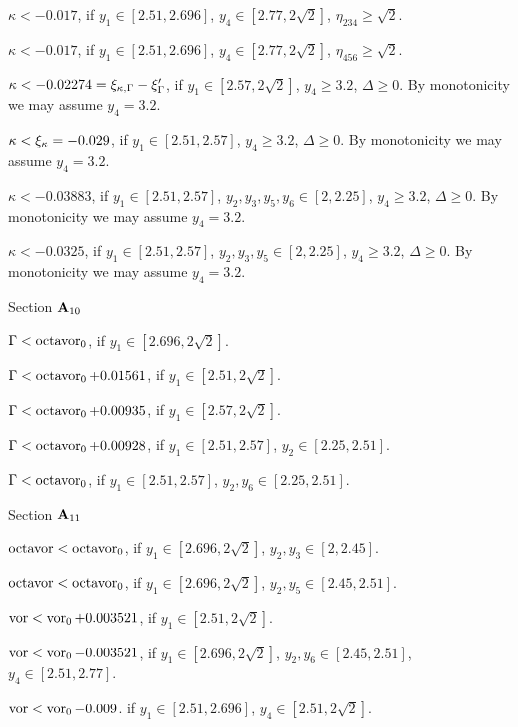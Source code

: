  $\kappa < -0.017$,
	if $y_1\in[2.51,2.696]$, $y_4\in[2.77,2\sqrt{2}]$, $\eta_{234}\ge \sqrt{2}$.

 $\kappa < -0.017$,
	if $y_1\in[2.51,2.696]$, $y_4\in[2.77,2\sqrt{2}]$, 
		$\eta_{456}\ge \sqrt{2}$.

 $\kappa< -0.02274 = \xi_{\kappa,\Gamma}-\xi_\Gamma'$, if
	$y_1\in[2.57,2\sqrt{2}]$, $y_4\ge 3.2$, 
	$\Delta\ge0$.
By monotonicity we may assume $y_4=3.2$. 

 $\kappa< \xi_\kappa = -0.029$, if
	$y_1\in[2.51,2.57]$, $y_4\ge 3.2$, 
	$\Delta\ge0$.
By monotonicity we may assume $y_4=3.2$. 

  $\kappa< -0.03883$,
	if $y_1\in[2.51,2.57]$,
	$y_2,y_3,y_5,y_6\in[2,2.25]$,
	$y_4\ge3.2$, $\Delta\ge0$.
By monotonicity we may assume $y_4=3.2$. 
	
  $\kappa< -0.0325$,
	if $y_1\in[2.51,2.57]$,
	$y_2,y_3,y_5\in[2,2.25]$,
	$y_4\ge3.2$,
	$\Delta\ge0$.   
By monotonicity we may assume $y_4=3.2$. 

\subhead Section ${\bold A}_{10}$\endsubhead


  $\Gamma< \operatorname{octavor}_0$, if
	$y_1\in[2.696,2\sqrt{2}]$.


 $\Gamma < \operatorname{octavor}_0 + 0.01561$, 
	if $y_1\in[2.51,2\sqrt{2}]$.

 $\Gamma < \operatorname{octavor}_0 + 0.00935$, if
	$y_1\in[2.57,2\sqrt{2}]$.

 $\Gamma<\operatorname{octavor}_0+0.00928$,
	if $y_1\in[2.51,2.57]$,
	$y_2\in [2.25,2.51]$.

 $\Gamma<\operatorname{octavor}_0$,
	if $y_1\in[2.51,2.57]$,
	$y_2,y_6\in [2.25,2.51]$.

\subhead Section ${\bold A}_{11}$\endsubhead


 $\operatorname{octavor}<\operatorname{octavor}_0$, if $y_1\in[2.696,2\sqrt{2}]$,
$y_2,y_3\in[2,2.45]$.

 $\operatorname{octavor}< \operatorname{octavor}_0$, if $y_1\in[2.696,2\sqrt{2}]$,
	$y_2,y_5\in[2.45,2.51]$.

  $\operatorname{vor}<\operatorname{vor}_0 + 0.003521$, if $y_1\in[2.51,2\sqrt{2}]$.

 $\operatorname{vor} <\operatorname{vor}_0 - 0.003521$, if
	$y_1\in[2.696,2\sqrt{2}]$, $y_2,y_6\in[2.45,2.51]$,
	$y_4\in[2.51,2.77]$. 

 $\operatorname{vor} < \operatorname{vor}_0 -0.009$.
	if $y_1\in[2.51,2.696]$, $y_4\in[2.51,2\sqrt2]$.

